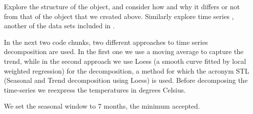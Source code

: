 \documentclass[krantz2]{krantz}\usepackage{knitr}
\begin{document}
\begin{playground}
Explore the structure of the  object, and consider how and why it differs or not from that of the object  that we created above. Similarly explore time series , another of the data sets included in \Rlang.

\begin{knitrout}\footnotesize
{}\color{fgcolor}\begin{kframe}
\begin{alltt}
\end{alltt}
\end{kframe}
\end{knitrout}

\end{playground}

In the next two code chunks, two different approaches to time series decomposition are used. In the first one we use a moving average to capture the trend, while in the second approach we use Loess (a smooth curve fitted by local weighted regression) for the decomposition, a method for which the acronym STL (Seasonal and Trend decomposition using Loess) is used. Before decomposing the time-series we reexpress the temperatures in degrees Celsius.

\begin{knitrout}\footnotesize
{}\color{fgcolor}\begin{kframe}
\begin{alltt}
 \hlkwb{<-}  \hlopt{-} \hlstd{)} \hlopt{*} \hlopt{/}
\end{alltt}
\end{kframe}
\end{knitrout}

We set the seasonal window to 7 months, the minimum accepted.
\end{document}
